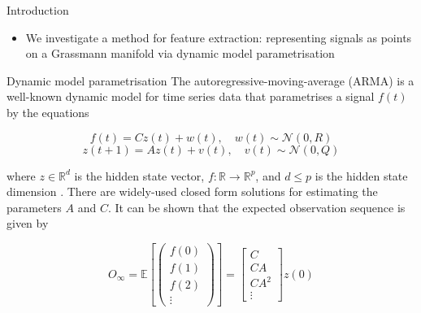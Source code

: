 \documentclass[final]{beamer}
\newlength{\onecolwid}
\begin{document}
\begin{frame}[t]
\begin{columns}[t]
\begin{column}{\onecolwid}
\begin{block}{Introduction}
\begin{itemize}
\begin{itemize}
\end{itemize}
 
        \item We investigate a  method for feature extraction: representing signals as points
            on a Grassmann manifold via dynamic model parametrisation
    \end{itemize}
\end{block}

\begin{block}{Dynamic model parametrisation}
    The autoregressive-moving-average (ARMA) is a well-known dynamic model for time series data that
    parametrises a signal $f(t)$ by the equations

    \begin{equation}
        f(t) = Cz(t) + w(t), \quad w(t) \sim \mathcal{N}(0, R)
    \end{equation}
    \begin{equation}
        z(t + 1) = Az(t) + v(t), \quad v(t) \sim \mathcal{N}(0, Q)
    \end{equation}

    where $z \in \mathbb{R}^d$ is the hidden state vector, $f : \mathbb{R} \rightarrow
    \mathbb{R}^p$, and $d \leq p$ is the hidden state dimension \cite{turaga_statistical_2011}.
    There are widely-used closed form solutions for estimating the parameters $A$ and $C$. It can be
    shown that the expected observation sequence is given by

    \begin{equation}\label{eq:observation}
        O_\infty = \mathbb{E}\left[\begin{pmatrix} f(0) \\ f(1) \\ f(2) \\ \vdots
            \end{pmatrix}\right] = \begin{bmatrix} C \\ CA \\ CA^2 \\ \vdots \end{bmatrix} z(0)
    \end{equation}
\end{block}



\end{column}
\end{columns}
\end{frame}
\end{document}

